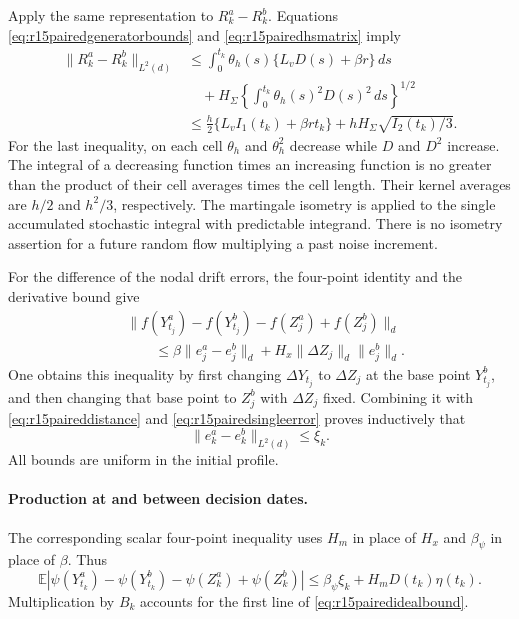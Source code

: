 Apply the same representation to $R_k^a-R_k^b$.
Equations \eqref{eq:r15pairedgeneratorbounds} and
\eqref{eq:r15pairedhsmatrix} imply
\begin{align*}
 \|R_k^a-R_k^b\|_{L^2(d)}
 &\leq\int_0^{t_k}\theta_h(s)\{L_vD(s)+\beta r\}\,ds\\
 &\quad+H_\Sigma
       \left\{\int_0^{t_k}\theta_h(s)^2D(s)^2\,ds\right\}^{1/2}\\
 &\leq\frac h2\{L_vI_1(t_k)+\beta r t_k\}
                         +hH_\Sigma\sqrt{I_2(t_k)/3}.
\end{align*}
For the last inequality, on each cell $\theta_h$ and
$\theta_h^2$ decrease while $D$ and $D^2$ increase. The integral
of a decreasing function times an increasing function is no greater than
the product of their cell averages times the cell length. Their kernel
averages are $h/2$ and $h^2/3$, respectively.
The martingale isometry is applied to the single accumulated stochastic
integral with predictable integrand. There is no isometry assertion for
a future random flow multiplying a past noise increment.

For the difference of the nodal drift errors, the four-point identity and
the derivative bound give
\begin{align*}
 &\|f(Y_{t_j}^a)-f(Y_{t_j}^b)
                         -f(Z_j^a)+f(Z_j^b)\|_d\\
 &\qquad\leq\beta\|e_j^a-e_j^b\|_d
                    +H_x\|\Delta Z_j\|_d\|e_j^b\|_d.
\end{align*}
One obtains this inequality by first changing $\Delta Y_{t_j}$ to
$\Delta Z_j$ at the base point $Y_{t_j}^b$, and then changing that
base point to $Z_j^b$ with $\Delta Z_j$ fixed.
Combining it with \eqref{eq:r15paireddistance} and
\eqref{eq:r15pairedsingleerror} proves inductively that
\begin{equation}
 \|e_k^a-e_k^b\|_{L^2(d)}\leq\xi_k.
 \label{eq:r15pairednodalerror}
\end{equation}
All bounds are uniform in the initial profile.

\paragraph*{Production at and between decision dates.}
The corresponding scalar four-point inequality uses $H_m$ in place of
$H_x$ and $\beta_\psi$ in place of $\beta$. Thus
\[
 \mathbb E|\psi(Y_{t_k}^a)-\psi(Y_{t_k}^b)
                       -\psi(Z_k^a)+\psi(Z_k^b)|
 \leq\beta_\psi\xi_k+H_mD(t_k)\eta(t_k).
\]
Multiplication by $B_k$ accounts for the first line of
\eqref{eq:r15pairedidealbound}.

